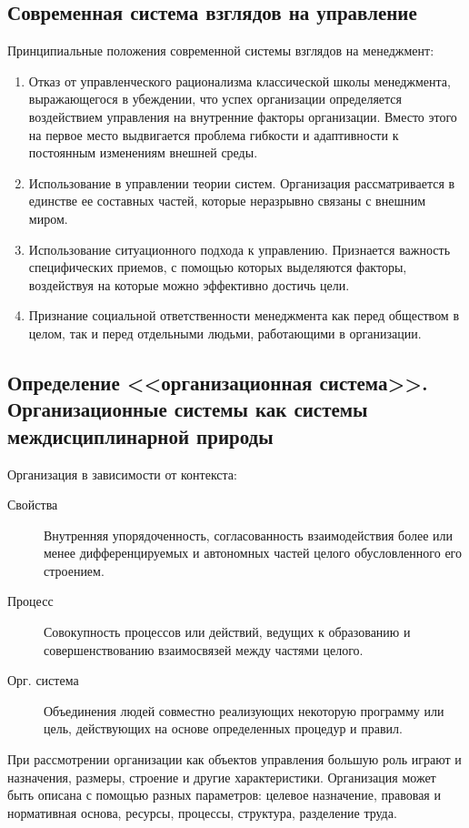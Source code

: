 \documentclass[a4paper,12pt,oneside,final]{extarticle}
\numberwithin{equation}{section}
\begin{document}
\subsection{Современная система взглядов на управление}
Принципиальные положения современной системы взглядов на менеджмент:
\begin{enumerate}
	\item Отказ от управленческого рационализма классической школы менеджмента, выражающегося в убеждении, что успех организации определяется воздействием  управления на внутренние факторы организации. 
	Вместо этого на первое место выдвигается проблема гибкости и адаптивности к постоянным изменениям внешней среды.
	\item Использование в управлении теории систем. 
	Организация рассматривается в единстве ее составных частей, которые неразрывно  связаны с внешним миром.
	\item Использование ситуационного подхода к управлению. 
	Признается важность специфических приемов, с помощью которых выделяются факторы, воздействуя на которые можно эффективно достичь цели.
	\item Признание социальной ответственности менеджмента как перед обществом в целом, так и перед отдельными людьми, работающими в организации. 
\end{enumerate}

\subsection{Определение <<организационная система>>. Организационные системы как системы междисциплинарной природы}
Организация в зависимости от контекста:
\begin{description}
\item[Свойства] Внутренняя упорядоченность, согласованность взаимодействия более или менее дифференцируемых и автономных частей целого обусловленного его строением.
\item[Процесс] Совокупность процессов или действий, ведущих к образованию и совершенствованию взаимосвязей между частями целого.
\item[Орг. система] Объединения людей совместно реализующих некоторую программу или цель, действующих на основе определенных процедур и правил.
\end{description}

При рассмотрении организации как объектов управления большую роль играют и назначения, размеры, строение и другие характеристики. 
Организация может быть описана с помощью разных параметров: целевое назначение, правовая и нормативная основа, ресурсы, процессы, структура, разделение труда.
\end{document}
